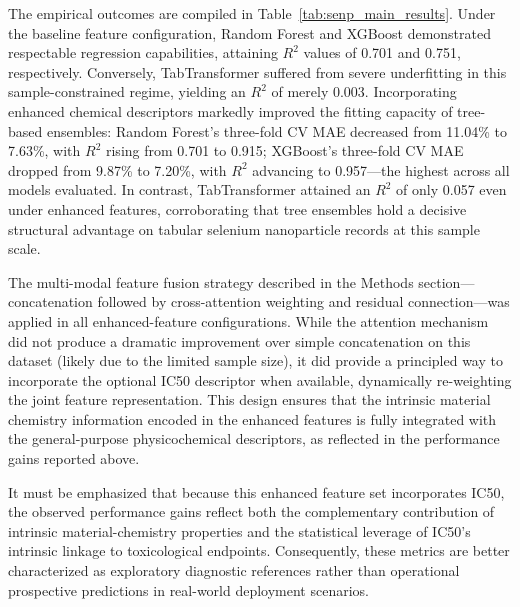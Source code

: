 \documentclass[letterpaper]{article}
\begin{document}
The empirical outcomes are compiled in Table~\ref{tab:senp_main_results}. Under the baseline feature configuration, Random Forest and XGBoost demonstrated respectable regression capabilities, attaining $R^2$ values of 0.701 and 0.751, respectively. Conversely, TabTransformer suffered from severe underfitting in this sample-constrained regime, yielding an $R^2$ of merely 0.003. Incorporating enhanced chemical descriptors markedly improved the fitting capacity of tree-based ensembles: Random Forest's three-fold CV MAE decreased from 11.04\% to 7.63\%, with $R^2$ rising from 0.701 to 0.915; XGBoost's three-fold CV MAE dropped from 9.87\% to 7.20\%, with $R^2$ advancing to 0.957—the highest across all models evaluated. In contrast, TabTransformer attained an $R^2$ of only 0.057 even under enhanced features, corroborating that tree ensembles hold a decisive structural advantage on tabular selenium nanoparticle records at this sample scale.

The multi-modal feature fusion strategy described in the Methods section—concatenation followed by cross-attention weighting and residual connection—was applied in all enhanced-feature configurations. While the attention mechanism did not produce a dramatic improvement over simple concatenation on this dataset (likely due to the limited sample size), it did provide a principled way to incorporate the optional IC50 descriptor when available, dynamically re-weighting the joint feature representation. This design ensures that the intrinsic material chemistry information encoded in the enhanced features is fully integrated with the general-purpose physicochemical descriptors, as reflected in the performance gains reported above.

It must be emphasized that because this enhanced feature set incorporates IC50, the observed performance gains reflect both the complementary contribution of intrinsic material-chemistry properties and the statistical leverage of IC50's intrinsic linkage to toxicological endpoints. Consequently, these metrics are better characterized as exploratory diagnostic references rather than operational prospective predictions in real-world deployment scenarios.
\end{document}
